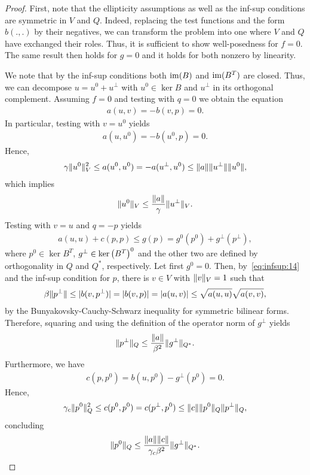 \begin{proof}
  First, note that the ellipticity assumptions as well as the inf-sup
  conditions are symmetric in $V$ and $Q$. Indeed, replacing the test
  functions and the form $b(.,.)$ by their negatives, we can transform
  the problem into one where $V$ and $Q$ have exchanged their
  roles. Thus, it is sufficient to show well-posedness for $f=0$. The
  same result then holds for $g=0$ and it holds for both nonzero by
  linearity.
  
  We note that by the inf-sup conditions both $\operatorname{im}(B)$ and
  $\operatorname{im}(B^T)$ are closed. Thus, we can decompose $u=u^0+u^\perp$
  with $u^0\in\ker B$ and $u^\perp$ in its orthogonal
  complement. Assuming $f=0$ and testing with $q=0$ we obtain the
  equation
  \begin{gather}
    \label{eq:infsup:14}
    a(u,v) = -b(v,p) = 0.
  \end{gather}
  In particular, testing with $v=u^0$ yields
  \begin{gather*}
    a(u,u^0) = -b(u^0,p) = 0.
  \end{gather*}
  Hence,
  \begin{gather*}
    \gamma \lVert u^0\rVert^2_V \le a(u^0,u^0)
    = -a(u^\perp,u^0)
    \le \lVert a\rVert \lVert u^\perp\rVert\lVert u^0\rVert,
  \end{gather*}
  which implies
  \begin{gather}
    \label{eq:infsup:15}
    \lVert u^0\rVert_V \le \frac{\lVert a\rVert}{\gamma} \lVert u^\perp\rVert_V.
  \end{gather}
  Testing with $v=u$ and $q=-p$ yields
  \begin{gather*}
    a(u,u)+c(p,p) \le g(p) = g^0(p^0) + g^\perp(p^\perp),
  \end{gather*}
  where $p^0\in \ker{B^T}$, $g^\perp\in \operatorname{ker}\left(B^T\right)^0$ and the
  other two are defined by orthogonality in $Q$ and $Q^*$,
  respectively. Let first $g^0=0$. Then, by~\eqref{eq:infsup:14} and
  the inf-sup condition for $p$, there is $v\in V$ with $\lVert v\rVert_V = 1$
  such that
  \begin{gather*}
    \beta \lVert p^\perp\rVert \le
    \lvert b(v,p^\perp)\rvert = \lvert b(v,p)\rvert = \lvert a(u,v)\rvert
    \le \sqrt{a(u,u)}\sqrt{a(v,v)},
  \end{gather*}
  by the Bunyakovsky-Cauchy-Schwarz inequality for symmetric bilinear
  forms.  Therefore, squaring and using the definition of the operator
  norm of $g^\perp$ yields
  \begin{gather*}
    \lVert p^\perp\rVert_Q \le \frac{\lVert a\rVert}{\beta^2}\lVert g^\perp\rVert_{Q^*}.
  \end{gather*}
  Furthermore, we have
  \begin{gather*}
    c(p,p^0) = b(u,p^0) - g^\perp(p^0) = 0.
  \end{gather*}
  Hence,
  \begin{gather*}
    \gamma_c \lVert p^0\rVert_Q^2 \le c(p^0,p^0)
    = c(p^\perp,p^0) \le \lVert c\rVert \lVert p^0\rVert_Q \lVert p^\perp\rVert_Q,
  \end{gather*}
  concluding
  \begin{gather*}
    \lVert p^0\rVert_Q
    \le \frac{\lVert a\rVert \lVert c\rVert}{\gamma_c\beta^2}
    \lVert g^\perp\rVert_{Q^*}.
  \end{gather*}


\end{proof}

